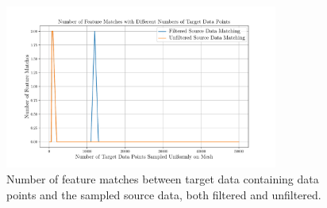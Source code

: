 \begin{figure}[!h]
	\begin{center}
		\includegraphics[width=0.8\textwidth]{chapters/2-pose-estimation/fig/number-of-feature-matches-with-different-numbers-of-target-data-points.pdf}
	\end{center}
	\caption{Number of feature matches between target data containing \mvar{\gamma} data points and the sampled source data, both filtered and unfiltered.}
	\label{fig:number-of-feature-matches-with-different-numbers-of-target-data-points}
\end{figure}
